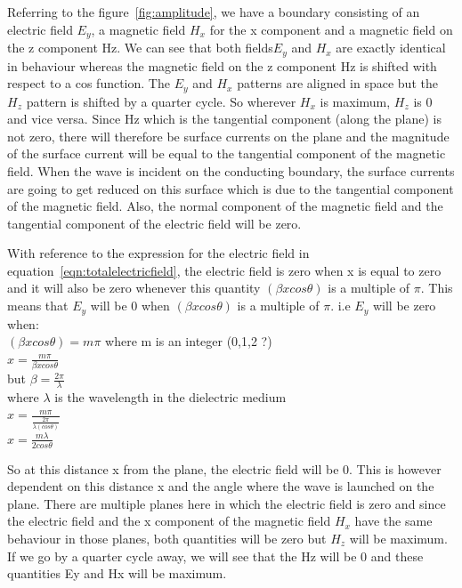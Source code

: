 Referring to the figure~\ref{fig:amplitude}, we have a boundary consisting of an electric field $E_y$, a magnetic field $H_x$ for the x component and a magnetic field on the z component Hz. We can see that both fields$ E_y$ and $H_x$ are exactly identical in behaviour whereas the magnetic field on the z component Hz is shifted with respect to a cos function. The $E_y$ and $H_x$ patterns are aligned in space but the $H_z$ pattern is shifted by a quarter cycle. So wherever $H_x$ is maximum, $H_z$ is 0 and vice versa. Since Hz which is the tangential component (along the plane) is not zero, there will therefore be surface currents on the plane and the magnitude of the surface current will be equal to the tangential component of the magnetic field. When the wave is incident on the conducting boundary, the surface currents are going to get reduced on this surface which is due to the tangential component of the magnetic field. Also, the normal component of the magnetic field and the tangential component of the electric field will be zero.

With reference to the expression for the electric field in equation~\ref{eqn:totalelectricfield}, the electric field is zero when x is equal to zero and it will also be zero whenever this quantity $(\beta xcos\theta)$ is a multiple of $\pi$. This means that $E_y$ will be 0 when $(\beta xcos\theta)$ is a multiple of $\pi$. i.e $E_y$ will be zero when:\\
$(\beta xcos\theta) = m\pi$     where m is an integer (0,1,2 ?)\\ 
$ x = \frac{m\pi}{\beta xcos\theta}$   \\ 
but $\beta = \frac{2\pi}{\lambda}$ \\
where $\lambda$ is the wavelength in the dielectric medium\\ 
$x =\frac{m\pi}{ \frac{2\pi}{\lambda (cos\theta)}} $\\ 
$x = \frac{m\lambda}{2cos\theta}$ 

So at this distance x from the plane, the electric field will be 0. This is however dependent on this distance x and the angle where the wave is launched on the plane. There are multiple planes here in which the electric field is zero and since the electric field and the x component of the magnetic field $H_x$ have the same behaviour in those planes, both quantities will be zero but $H_z$ will be maximum. If we go by a quarter cycle away, we will see that the Hz will be 0 and these quantities Ey and Hx will be maximum.

